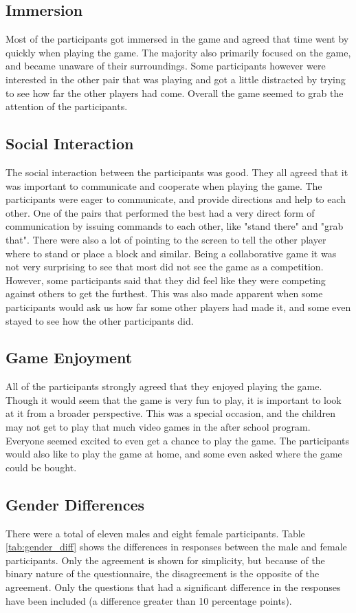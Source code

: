 \subsection{Immersion}
Most of the participants got immersed in the game and agreed that time went by quickly when playing the game. The majority also primarily focused on the game, and became unaware of their surroundings. Some participants however were interested in the other pair that was playing and got a little distracted by trying to see how far the other players had come. Overall the game seemed to grab the attention of the participants.

\subsection{Social Interaction}
The social interaction between the participants was good. They all agreed that it was important to communicate and cooperate when playing the game. The participants were eager to communicate, and provide directions and help to each other. One of the pairs that performed the best had a very direct form of communication by issuing commands to each other, like "stand there" and "grab that". There were also a lot of pointing to the screen to tell the other player where to stand or place a block and similar. Being a collaborative game it was not very surprising to see that most did not see the game as a competition. However, some participants said that they did feel like they were competing against others to get the furthest. This was also made apparent when some participants would ask us how far some other players had made it, and some even stayed to see how the other participants did.

\subsection{Game Enjoyment}
All of the participants strongly agreed that they enjoyed playing the game. Though it would seem that the game is very fun to play, it is important to look at it from a broader perspective. This was a special occasion, and the children may not get to play that much video games in the after school program. Everyone seemed excited to even get a chance to play the game. The participants would also like to play the game at home, and some even asked where the game could be bought.

\subsection{Gender Differences}
There were a total of eleven males and eight female participants. Table \ref{tab:gender_diff} shows the differences in responses between the male and female participants. Only the agreement is shown for simplicity, but because of the binary nature of the questionnaire, the disagreement is the opposite of the agreement. Only the questions that had a significant difference in the responses have been included (a difference greater than 10 percentage points).

